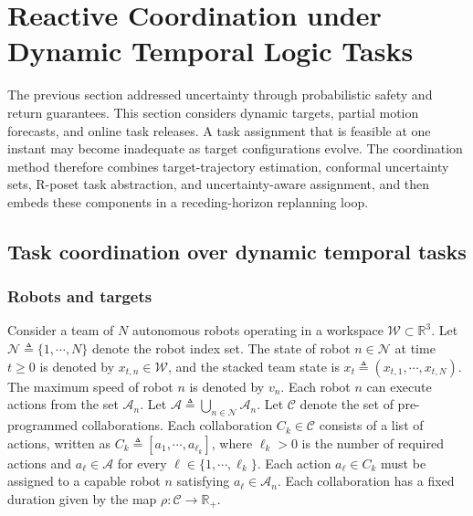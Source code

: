 \section{Reactive Coordination under Dynamic Temporal Logic Tasks}
\label{ch06:sec:ch06_uncertain}

The previous section addressed uncertainty through probabilistic safety and
return guarantees. This section considers dynamic targets, partial motion
forecasts, and online task releases. A task assignment that is feasible at one
instant may become inadequate as target configurations evolve. The coordination
method therefore combines target-trajectory estimation, conformal uncertainty
sets, R-poset task abstraction, and uncertainty-aware assignment, and then embeds
these components in a receding-horizon replanning loop.


\subsection{Task coordination over dynamic temporal tasks}
\label{ch06:sec:problem}


\subsubsection{Robots and targets}
\label{ch06:subsec:robots}

Consider a team of $N$ autonomous robots operating in a workspace
$\mathcal{W} \subset \mathbb{R}^{3}$. Let
$\mathcal{N} \triangleq \{1,\cdots,N\}$ denote the robot index set. The
state of robot $n \in \mathcal{N}$ at time $t \geq 0$ is denoted by
$x_{t,n} \in \mathcal{W}$, and the stacked team state is
$x_t \triangleq (x_{t,1},\cdots,x_{t,N})$. The maximum speed of robot
$n$ is denoted by $v_n$. Each robot $n$ can execute actions from the set
$\mathcal{A}_n$. Let
$\mathcal{A} \triangleq \bigcup_{n \in \mathcal{N}} \mathcal{A}_n$.
Let $\mathcal{C}$ denote the set of pre-programmed collaborations. Each
collaboration $C_k \in \mathcal{C}$ consists of a list of actions,
written as $C_k \triangleq [a_1,\cdots,a_{\ell_k}]$, where $\ell_k > 0$
is the number of required actions and $a_{\ell} \in \mathcal{A}$ for
every $\ell \in \{1,\cdots,\ell_k\}$. Each action $a_{\ell} \in C_k$
must be assigned to a capable robot $n$ satisfying
$a_{\ell} \in \mathcal{A}_n$. Each collaboration has a fixed duration
given by the map $\rho : \mathcal{C} \rightarrow \mathbb{R}_{+}$.

